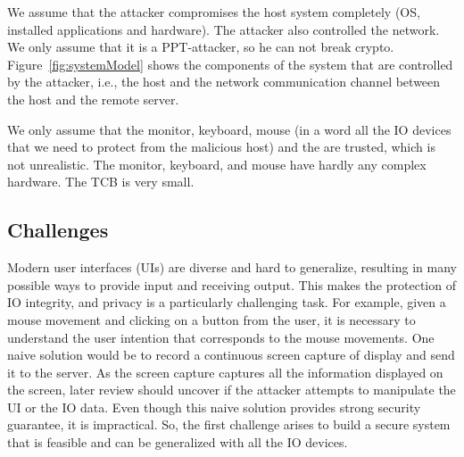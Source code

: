 We assume that the attacker compromises the host system completely (OS, installed applications and hardware). The attacker also controlled the network. We only assume that it is a PPT-attacker, so he can not break crypto. Figure~\ref{fig:systemModel} shows the components of the system that are controlled by the attacker, i.e., the host and the network communication channel between the host and the remote server.

We only assume that the monitor, keyboard, mouse (in a word all the IO devices that we need to protect from the malicious host) and the \device are trusted, which is not unrealistic. The monitor, keyboard, and mouse have hardly any complex hardware. The TCB is very small.

\subsection{Challenges}


Modern user interfaces (UIs) are diverse and hard to generalize, resulting in many possible ways to provide input and receiving output.  This makes the protection of IO integrity, and privacy is a particularly challenging task. For example, given a mouse movement and clicking on a button from the user, it is necessary to understand the user intention that corresponds to the mouse movements. One naive solution would be to record a continuous screen capture of display and send it to the server. As the screen capture captures all the information displayed on the screen, later review should uncover if the attacker attempts to manipulate the UI or the IO data. Even though this naive solution provides strong security guarantee, it is impractical. So, the first challenge arises to build a secure system that is feasible and can be generalized with all the IO devices.   

